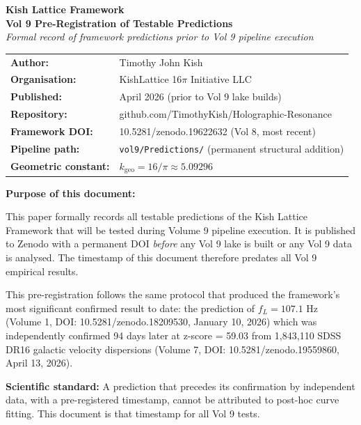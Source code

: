 \documentclass[12pt, letterpaper]{article}
\begin{document}
\begin{center}
{\LARGE\bfseries Kish Lattice Framework}\\[0.4em]
{\Large\bfseries Vol 9 Pre-Registration of Testable Predictions}\\[0.5em]
{\large\itshape Formal record of framework predictions prior to Vol 9
pipeline execution}\\[1em]

\begin{tabular}{ll}
\textbf{Author:} & Timothy John Kish \\
\textbf{Organisation:} & KishLattice 16$\pi$ Initiative LLC \\
\textbf{Published:} & April 2026 (prior to Vol 9 lake builds) \\
\textbf{Repository:} &
  github.com/TimothyKish/Holographic-Resonance \\
\textbf{Framework DOI:} & 10.5281/zenodo.19622632 (Vol 8, most recent) \\
\textbf{Pipeline path:} &
  \texttt{vol9/Predictions/} (permanent structural addition) \\
\textbf{Geometric constant:} & $k_\mathrm{geo} = 16/\pi \approx 5.09296$ \\
\end{tabular}
\end{center}

\bigskip

\begin{protocolbox}
\textbf{Purpose of this document:}

This paper formally records all testable predictions of the Kish Lattice
Framework that will be tested during Volume 9 pipeline execution. It is
published to Zenodo with a permanent DOI \textit{before} any Vol 9 lake
is built or any Vol 9 data is analysed. The timestamp of this document
therefore predates all Vol 9 empirical results.

\medskip
This pre-registration follows the same protocol that produced the
framework's most significant confirmed result to date: the prediction of
$f_L = 107.1$ Hz (Volume 1, DOI: 10.5281/zenodo.18209530, January 10,
2026) which was independently confirmed 94 days later at z-score = 59.03
from 1,843,110 SDSS DR16 galactic velocity dispersions (Volume 7, DOI:
10.5281/zenodo.19559860, April 13, 2026).

\medskip
\textbf{Scientific standard:} A prediction that precedes its confirmation
by independent data, with a pre-registered timestamp, cannot be attributed
to post-hoc curve fitting. This document is that timestamp for all Vol 9
tests.
\end{protocolbox}
\end{document}
